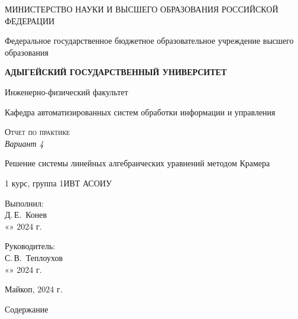 \documentclass[12pt,a4paper]{scrartcl}
\begin{document}
	\begin{titlepage}
		\begin{center}
			\large
			МИНИСТЕРСТВО НАУКИ И ВЫСШЕГО ОБРАЗОВАНИЯ РОССИЙСКОЙ ФЕДЕРАЦИИ
			
			Федеральное государственное бюджетное образовательное учреждение высшего образования
			
			\textbf{АДЫГЕЙСКИЙ ГОСУДАРСТВЕННЫЙ УНИВЕРСИТЕТ}
			\vspace{0.25cm}
			
			Инженерно-физический факультет
			
			Кафедра автоматизированных систем обработки информации и управления
			\vfill

			\vfill
			
			\textsc{Отчет по практике}\\[5mm]
			
			\LARGE\textit{Вариант 4}
			
			{\LARGE Решение системы линейных алгебраических уравнений методом Крамера}
			\bigskip
			
			1 курс, группа 1ИВТ АСОИУ
		\end{center}
		\vfill
		
		\newlength{\ML}
		\hfill\begin{minipage}{0.5\textwidth}
			Выполнил:\\
			\underline{\hspace{\ML}} Д.\,Е.~Конев\\
			«\underline{\hspace{0.7cm}}» \underline{\hspace{2cm}} 2024 г.
		\end{minipage}%
		\bigskip
		
		\hfill\begin{minipage}{0.5\textwidth}
			Руководитель:\\
			\underline{\hspace{\ML}} С.\,В.~Теплоухов\\
			«\underline{\hspace{0.7cm}}» \underline{\hspace{2cm}} 2024 г.
		\end{minipage}%
		
		
		\vfill
		
		
		
		\begin{center}
			
			Майкоп, 2024 г.
		\end{center}
	\end{titlepage}
\LARGE{Содержание}
\end{document}
